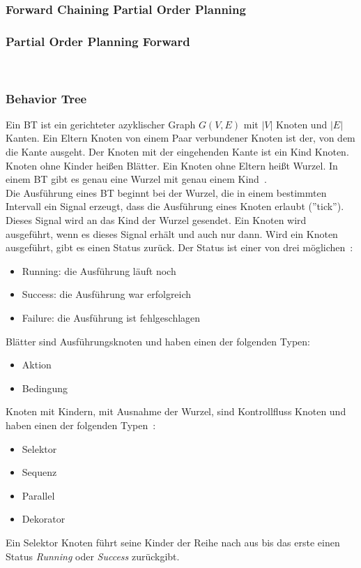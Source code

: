 \subsubsection{Forward Chaining Partial Order Planning}
\subsubsection{Partial Order Planning Forward}
~\citep{popf}
\subsubsection{Behavior Tree}
Ein \ac{BT} ist ein gerichteter azyklischer Graph $G(V,E)$ mit $|V|$ Knoten und $|E|$ Kanten.
Ein Eltern Knoten von einem Paar verbundener Knoten ist der, von dem die Kante ausgeht.
Der Knoten mit der eingehenden Kante ist ein Kind Knoten.
Knoten ohne Kinder heißen Blätter.
Ein Knoten ohne Eltern heißt Wurzel.
In einem \ac{BT} gibt es genau eine Wurzel mit genau einem Kind~\cite{bt_1}.\\
Die Ausführung eines \ac{BT} beginnt bei der Wurzel, die in einem bestimmten Intervall ein Signal erzeugt, dass die Ausführung eines Knoten erlaubt (''tick'').
Dieses Signal wird an das Kind der Wurzel gesendet.
Ein Knoten wird ausgeführt, wenn es dieses Signal erhält und auch nur dann.
Wird ein Knoten ausgeführt, gibt es einen Status zurück.
Der Status ist einer von drei möglichen~\cite{bt_book}:
\begin{itemize}
    \item Running: die Ausführung läuft noch
    \item Success: die Ausführung war erfolgreich
    \item Failure: die Ausführung ist fehlgeschlagen
\end{itemize}
Blätter sind Ausführungsknoten und haben einen der folgenden Typen:
\begin{itemize}
    \item Aktion
    \item Bedingung
\end{itemize}
Knoten mit Kindern, mit Ausnahme der Wurzel, sind Kontrollfluss Knoten und haben einen der folgenden Typen~\cite{bt_1}:
\begin{itemize}
    \item Selektor
    \item Sequenz
    \item Parallel
    \item Dekorator
\end{itemize}
Ein Selektor Knoten führt seine Kinder der Reihe nach aus bis das erste einen Status \emph{Running} oder \emph{Success} zurückgibt.
